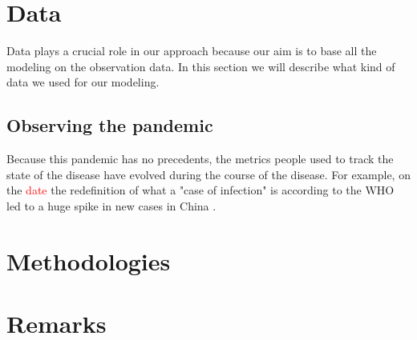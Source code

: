 \documentclass[12pt, letterpaper]{article}
\newcommand{\com}[1] {{\small {\fontfamily{ptm} \selectfont \textcolor{red}{#1}}}}
\begin{document}
\section{Data}

Data plays a crucial role in our approach because our aim is to base all the modeling on the observation data. In this section we will describe what kind of data we used for our modeling.

\subsection{Observing the pandemic}

Because this pandemic has no precedents, the metrics people used to track the state of the disease have evolved during the course of the disease. For example, on the \com{date} the redefinition of what a "case of infection" is according to the WHO led to a huge spike in new cases in China \cite{}. 

\section{Methodologies}

\section{Remarks}
\end{document}
